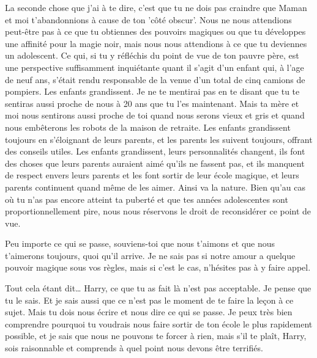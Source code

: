 La seconde chose que j'ai à te dire, c'est que tu ne dois pas craindre que Maman et moi t'abandonnions à cause de ton 'côté obscur'. Nous ne nous attendions peut-être pas à ce que tu obtiennes des pouvoirs magiques ou que tu développes une affinité pour la magie noir, mais nous nous attendions à ce que tu deviennes un adolescent. Ce qui, si tu y réfléchis du point de vue de ton pauvre père, est une perspective suffisamment inquiétante quant il s'agit d'un enfant qui, à l'age de neuf ans, s'était rendu responsable de la venue d'un total de cinq camions de pompiers. Les enfants grandissent. Je ne te mentirai pas en te disant que tu te sentiras aussi proche de nous à 20 ans que tu l'es maintenant. Mais ta mère et moi nous sentirons aussi proche de toi quand nous serons vieux et gris et quand nous embêterons les robots de la maison de retraite. Les enfants grandissent toujours en s'éloignant de leurs parents, et les parents les suivent toujours, offrant des conseils utiles. Les enfants grandissent, leurs personnalités changent, ils font des choses que leurs parents auraient aimé qu'ils ne fassent pas, et ils manquent de respect envers leurs parents et les font sortir de leur école magique, et leurs parents continuent quand même de les aimer. Ainsi va la nature. Bien qu'au cas où tu n'as pas encore atteint ta puberté et que tes années adolescentes sont proportionnellement pire, nous nous réservons le droit de reconsidérer ce point de vue.

Peu importe ce qui se passe, souviens-toi que nous t'aimons et que nous t'aimerons toujours, quoi qu'il arrive. Je ne sais pas si notre amour a quelque pouvoir magique sous vos règles, mais si c'est le cas, n'hésites pas à y faire appel.

Tout cela étant dit… Harry, ce que tu as fait là n'est pas acceptable. Je pense que tu le sais. Et je sais aussi que ce n'est pas le moment de te faire la leçon à ce sujet. Mais tu dois nous écrire et nous dire ce qui se passe. Je peux très bien comprendre pourquoi tu voudrais nous faire sortir de ton école le plus rapidement possible, et je sais que nous ne pouvons te forcer à rien, mais s'il te plaît, Harry, sois raisonnable et comprends à quel point nous devons être terrifiés.

